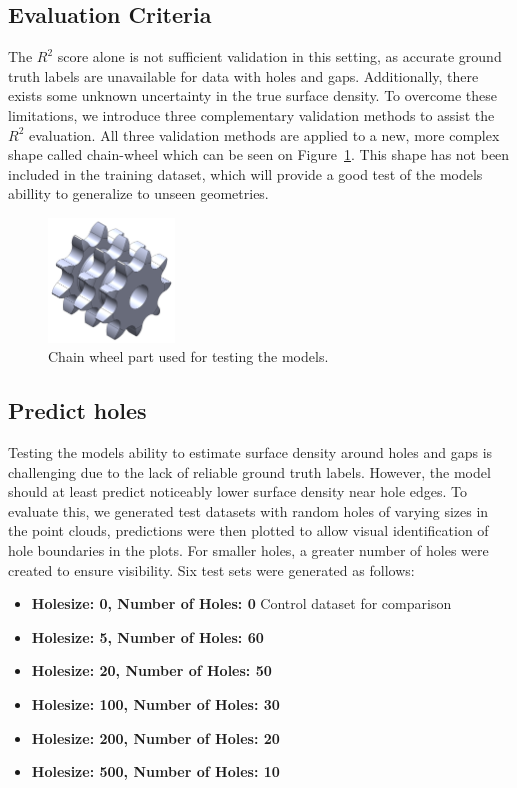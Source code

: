 \subsection{Evaluation Criteria}
The $R^2$ score alone is not sufficient validation in this setting, as accurate ground truth labels are unavailable for data with holes and gaps. Additionally, there exists some unknown uncertainty in the true surface density. To overcome these limitations, we introduce three complementary validation methods to assist the $R^2$ evaluation. All three validation methods are applied to a new, more complex shape called chain-wheel which can be seen on Figure~\ref{fig:chain_wheel}. This shape has not been included in the training dataset, which will provide a good test of the models abillity to generalize to unseen geometries.

\begin{figure}[htbp]
    \centering
    \includegraphics[width=0.3\textwidth]{figures/Chain_whee.PNG}
    \caption{Chain wheel part used for testing the models.} 
    \label{fig:chain_wheel}
\end{figure}

\subsection*{Predict holes}
Testing the models ability to estimate surface density around holes and gaps is challenging due to the lack of reliable ground truth labels. However, the model should at least predict noticeably lower surface density near hole edges. To evaluate this, we generated test datasets with random holes of varying sizes in the point clouds, predictions were then plotted to allow visual identification of hole boundaries in the plots. For smaller holes, a greater number of holes were created to ensure visibility. Six test sets were generated as follows:
\begin{itemize}
    \item \textbf{Holesize: 0, Number of Holes: 0} Control dataset for comparison
    \item \textbf{Holesize: 5, Number of Holes: 60}
    \item \textbf{Holesize: 20, Number of Holes: 50}
    \item \textbf{Holesize: 100, Number of Holes: 30}
    \item \textbf{Holesize: 200, Number of Holes: 20}
    \item \textbf{Holesize: 500, Number of Holes: 10}
\end{itemize}

